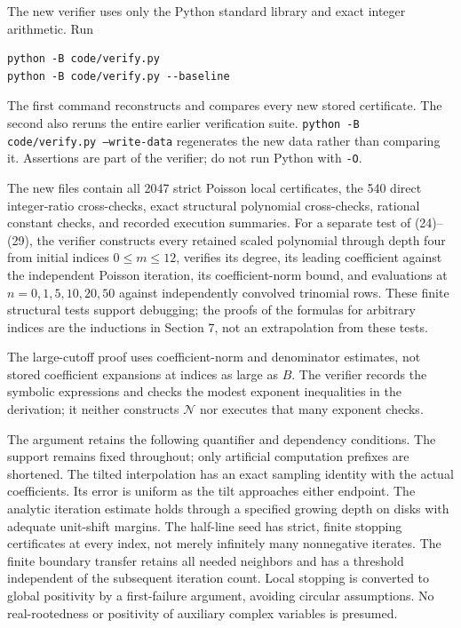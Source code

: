 \documentclass[11pt,a4paper]{article}
\begin{document}
The new verifier uses only the Python standard library and exact integer
arithmetic. Run

\begin{verbatim}
python -B code/verify.py
python -B code/verify.py --baseline
\end{verbatim}

The first command reconstructs and compares every new stored
certificate. The second also reruns the entire earlier verification
suite. \texttt{python -B code/verify.py --write-data} regenerates the new
data rather than comparing it. Assertions are part of the verifier; do
not run Python with \texttt{-O}.

The new files contain all 2047 strict Poisson local certificates, the
540 direct integer-ratio cross-checks, exact structural polynomial
cross-checks, rational constant checks, and recorded execution summaries. For a
separate test of (24)--(29), the verifier constructs every retained
scaled polynomial through depth four from initial indices
\(0\leq m\leq12\), verifies its degree, its leading coefficient against
the independent Poisson iteration, its coefficient-norm bound, and
evaluations at \(n=0,1,5,10,20,50\) against independently convolved
trinomial rows. These finite structural tests support debugging; the
proofs of the formulas for arbitrary indices are the inductions in
Section 7, not an extrapolation from these tests.

The large-cutoff proof uses coefficient-norm and denominator estimates,
not stored coefficient expansions at indices as large as \(B\). The
verifier records the symbolic expressions and checks the modest exponent
inequalities in the derivation; it neither constructs \(\mathcal N\) nor
executes that many exponent checks.

The argument retains the following quantifier and dependency conditions. The support
remains fixed throughout; only artificial computation prefixes are
shortened. The tilted interpolation has an exact sampling identity with
the actual coefficients. Its error is uniform as the tilt approaches
either endpoint. The analytic iteration estimate holds through a
specified growing depth on disks with adequate unit-shift margins. The
half-line seed has strict, finite stopping certificates at every index,
not merely infinitely many nonnegative iterates. The finite boundary
transfer retains all needed neighbors and has a threshold independent of
the subsequent iteration count. Local stopping is converted to global
positivity by a first-failure argument, avoiding circular assumptions.
No real-rootedness or positivity of auxiliary complex variables is
presumed.
\end{document}
